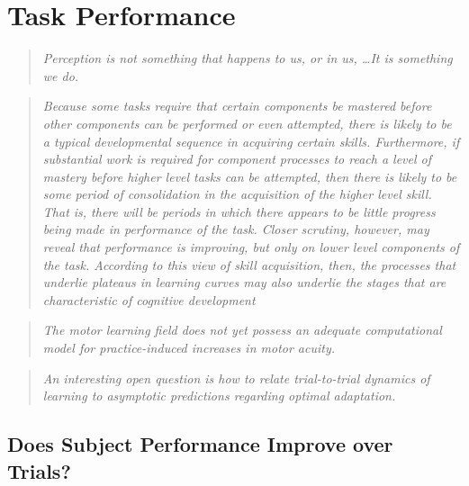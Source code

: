 \documentclass[../main.tex]{subfiles}
\begin{document}
\chapter{Task Performance}\label{chap:performance}


\begin{quote}
    \emph{Perception is not something that happens to us, or in us, \lbrack\ldots\rbrack It is something we do.}\\ 
\end{quote}

\begin{quote}
    \emph{Because some tasks require that certain components be mastered before other components can be performed or even attempted, there is likely to be a typical developmental sequence in acquiring certain skills. Furthermore, if substantial work is required for component processes to reach a level of mastery before higher level tasks can be attempted, then there is likely to be some period of consolidation in the acquisition of the higher level skill. That is, there will be periods in which there appears to be little progress being made in performance of the task. Closer scrutiny, however, may reveal that performance is improving, but only on lower level components of the task. According to this view of skill acquisition, then, the processes that underlie plateaus in learning curves may also underlie the stages that are characteristic of cognitive development}\\
\end{quote}

\begin{quote}
    \emph{The motor learning field does not yet possess an adequate computational model for practice-induced increases in motor acuity.}\\
\end{quote}

\begin{quote}
    \emph{An interesting open question is how to relate trial-to-trial dynamics of learning to asymptotic predictions regarding optimal adaptation.}\\
\end{quote}

\cleardoublepage%


\section{Does Subject Performance Improve over Trials?}
\end{document}
